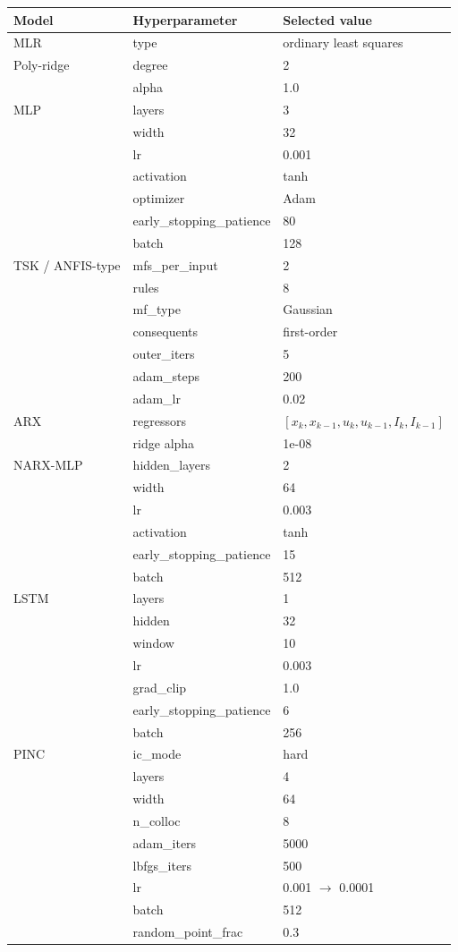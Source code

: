 \begin{tabular}{lll}
\toprule
Model & Hyperparameter & Selected value \\
\midrule
MLR & type & ordinary least squares \\
Poly-ridge & degree & 2 \\
 & alpha & 1.0 \\
MLP & layers & 3 \\
 & width & 32 \\
 & lr & 0.001 \\
 & activation & tanh \\
 & optimizer & Adam \\
 & early\_stopping\_patience & 80 \\
 & batch & 128 \\
TSK / ANFIS-type & mfs\_per\_input & 2 \\
 & rules & 8 \\
 & mf\_type & Gaussian \\
 & consequents & first-order \\
 & outer\_iters & 5 \\
 & adam\_steps & 200 \\
 & adam\_lr & 0.02 \\
ARX & regressors & $[x_k, x_{k-1}, u_k, u_{k-1}, I_k, I_{k-1}]$ \\
 & ridge alpha & 1e-08 \\
NARX-MLP & hidden\_layers & 2 \\
 & width & 64 \\
 & lr & 0.003 \\
 & activation & tanh \\
 & early\_stopping\_patience & 15 \\
 & batch & 512 \\
LSTM & layers & 1 \\
 & hidden & 32 \\
 & window & 10 \\
 & lr & 0.003 \\
 & grad\_clip & 1.0 \\
 & early\_stopping\_patience & 6 \\
 & batch & 256 \\
PINC & ic\_mode & hard \\
 & layers & 4 \\
 & width & 64 \\
 & n\_colloc & 8 \\
 & adam\_iters & 5000 \\
 & lbfgs\_iters & 500 \\
 & lr & 0.001 $\to$ 0.0001 \\
 & batch & 512 \\
 & random\_point\_frac & 0.3 \\
\bottomrule
\end{tabular}
